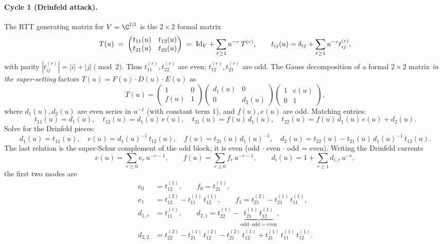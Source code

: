\paragraph{Cycle 1 (Drinfeld attack).} The RTT generating matrix for
$V = \C^{1|1}$ is the $2 \times 2$ formal matrix
\[
  T(u) \;=\; \begin{pmatrix} t_{11}(u) & t_{12}(u) \\
                             t_{21}(u) & t_{22}(u) \end{pmatrix}
  \;=\; \mathrm{Id}_V + \sum_{r \geq 1} u^{-r}\, T^{(r)},
  \qquad t_{ij}(u) = \delta_{ij} + \sum_{r\geq 1}u^{-r}t^{(r)}_{ij},
\]
with parity $|t^{(r)}_{ij}| = |i|+|j| \pmod 2$. Thus $t^{(r)}_{11},
t^{(r)}_{22}$ are even; $t^{(r)}_{12}, t^{(r)}_{21}$ are odd.
The Gauss decomposition of a formal $2 \times 2$ matrix
\emph{in the super-setting} factors $T(u) = F(u) \cdot D(u) \cdot E(u)$
as
\[
  T(u) = \begin{pmatrix} 1 & 0 \\ f(u) & 1 \end{pmatrix}
         \begin{pmatrix} d_1(u) & 0 \\ 0 & d_2(u) \end{pmatrix}
         \begin{pmatrix} 1 & e(u) \\ 0 & 1 \end{pmatrix},
\]
where $d_1(u), d_2(u)$ are even series in $u^{-1}$ (with constant term
$1$), and $f(u), e(u)$ are odd. Matching entries:
\[
  t_{11}(u) = d_1(u), \quad
  t_{12}(u) = d_1(u)\, e(u), \quad
  t_{21}(u) = f(u)\, d_1(u), \quad
  t_{22}(u) = f(u)\, d_1(u)\, e(u) + d_2(u).
\]
Solve for the Drinfeld pieces:
\begin{equation}
\label{eq:gauss-inversion-gl11}
  d_1(u) = t_{11}(u), \quad
  e(u) = d_1(u)^{-1}\, t_{12}(u), \quad
  f(u) = t_{21}(u)\, d_1(u)^{-1}, \quad
  d_2(u) = t_{22}(u) - t_{21}(u)\, d_1(u)^{-1}\, t_{12}(u).
\end{equation}
The last relation is the super-Schur complement of the odd block; it
is even (odd $\cdot$ even $\cdot$ odd = even). Writing the Drinfeld
currents
\[
  e(u) = \sum_{r \geq 0} e_r\, u^{-r-1}, \qquad
  f(u) = \sum_{r \geq 0} f_r\, u^{-r-1}, \qquad
  d_i(u) = 1 + \sum_{r \geq 1} d_{i,r}\, u^{-r},
\]
the first two modes are
\begin{align*}
  e_0 &= t^{(1)}_{12}, \qquad f_0 = t^{(1)}_{21}, \\
  e_1 &= t^{(2)}_{12} - t^{(1)}_{11}\, t^{(1)}_{12}, \qquad
  f_1 = t^{(2)}_{21} - t^{(1)}_{21}\, t^{(1)}_{11}, \\
  d_{1,r} &= t^{(r)}_{11}, \qquad
  d_{2,1} = t^{(1)}_{22} - \underbrace{t^{(1)}_{21}\,t^{(1)}_{12}}
                           _{\text{odd}\cdot\text{odd} = \text{even}},
  \\
  d_{2,2} &= t^{(2)}_{22} - t^{(1)}_{21}\, t^{(2)}_{12}
            - t^{(2)}_{21}\, t^{(1)}_{12}
            + t^{(1)}_{21}\, t^{(1)}_{11}\, t^{(1)}_{12}.
\end{align*}


